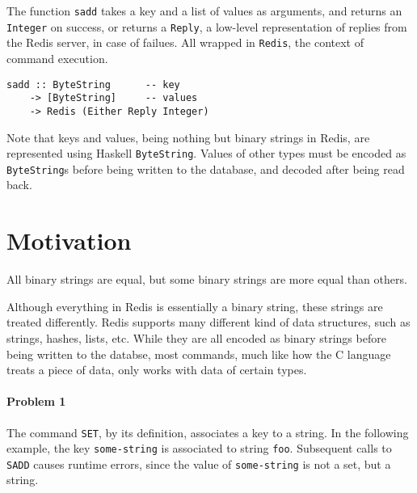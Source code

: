 \documentclass[pldi]{sigplanconf-pldi16}
\begin{document}
The function \texttt{sadd} takes a key and a list of values as
 arguments, and returns an \texttt{Integer} on success, or
 returns a \texttt{Reply}, a low-level representation of replies
 from the Redis server, in case of failues. All wrapped in
 \texttt{Redis}\footnotemark, the context of command execution.

\begin{verbatim}
sadd :: ByteString      -- key
    -> [ByteString]     -- values
    -> Redis (Either Reply Integer)
\end{verbatim}

Note that keys and values, being nothing but binary strings in Redis,
are represented using Haskell \texttt{ByteString}.
Values of other types must be encoded as \texttt{ByteString}s before being written to the database,
and decoded after being read back.


\section{Motivation}

All binary strings are equal, but some binary strings are more equal than others.

Although everything in Redis is essentially a binary string, these strings are treated differently. Redis supports many different
kind of data structures, such as strings, hashes, lists, etc. While
they are all encoded as binary strings before being written to the databse, most commands, much like how the C language treats a piece of data, only works with data of certain types.

\paragraph{Problem 1} The command \texttt{SET}, by
its definition, associates a key to a string. In the following
example, the key \texttt{some-string} is associated
to string \texttt{foo}. Subsequent calls to
\texttt{SADD} causes runtime errors, since the value
of \texttt{some-string} is not a set, but a string.
\end{document}

